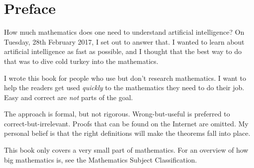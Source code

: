 \chapter*{Preface}

How much mathematics does one need to understand artificial intelligence?
On Tuesday, 28th February 2017, I set out to answer that.
I wanted to learn about artificial intelligence as fast as possible,
and I thought that the best way to do that was to dive cold turkey into the mathematics.

I wrote this book for people who use but don't research mathematics.
I want to help the readers get used \emph{quickly} to the mathematics they need to do their job.
Easy and correct are \emph{not} parts of the goal.

The approach is formal, but not rigorous.
Wrong-but-useful is preferred to correct-but-irrelevant.
Proofs that can be found on the Internet are omitted.
My personal belief is that the right definitions
will make the theorems fall into place.

This book only covers a very small part of mathematics.
For an overview of how big mathematics is,
see the Mathematics Subject Classification.
